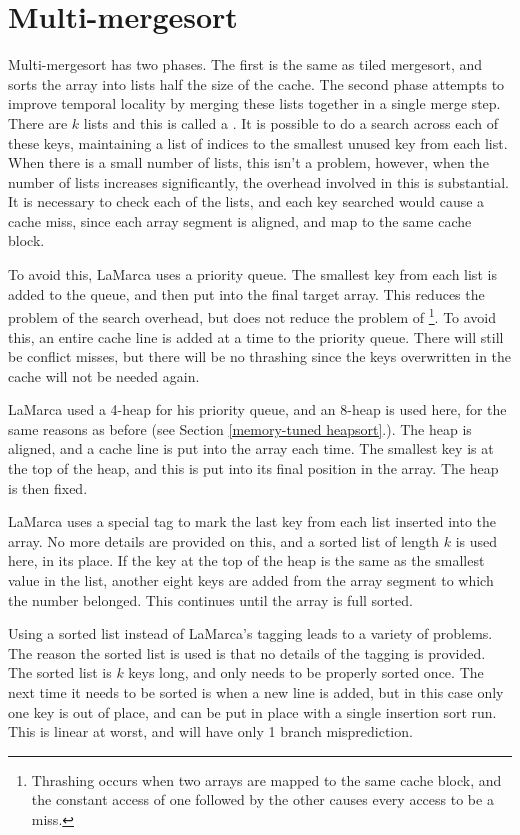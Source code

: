 \section{Multi-mergesort}

Multi-mergesort has two phases. The first is the same as tiled mergesort, and
sorts the array into lists half the size of the cache. The second phase attempts
to improve temporal locality by merging these lists together in a single merge
step. There are $k$ lists and this is called a . It is possible
to do a search across each of these keys, maintaining a list of indices to the
smallest unused key from each list. When there is a small number of lists, this
isn't a problem, however, when the number of lists increases significantly, the
overhead involved in this is substantial. It is necessary to check each of the
lists, and each key searched would cause a cache miss, since each array segment
is aligned, and map to the same cache block.

To avoid this, LaMarca uses a priority queue. The smallest key from each list is
added to the queue, and then put into the final target array. This reduces the
problem of the search overhead, but does not reduce the problem of
\footnote{Thrashing occurs when two arrays are mapped to the same
cache block, and the constant access of one followed by the other causes every
access to be a miss.}.  To avoid this, an entire cache line is added at a time
to the priority queue. There will still be conflict misses, but there will be no
thrashing since the keys overwritten in the cache will not be needed again.

LaMarca used a 4-heap for his priority queue, and an 8-heap is used here, for
the same reasons as before (see Section \ref{memory-tuned heapsort}.). The heap
is aligned, and a cache line is put into the array each time. The smallest key
is at the top of the heap, and this is put into its final position in the array.
The heap is then fixed.

LaMarca uses a special tag to mark the last key from each list inserted into
the array. No more details are provided on this, and a sorted list of length $k$
is used here, in its place.  If the key at the top of the heap is the same as
the smallest value in the list, another eight keys are added from the array
segment to which the number belonged. This continues until the array is full
sorted.

Using a sorted list instead of LaMarca's tagging leads to a variety of problems.
The reason the sorted list is used is that no details of the tagging is
provided. The sorted list is $k$ keys long, and only needs to be properly sorted
once. The next time it needs to be sorted is when a new line is added, but in
this case only one key is out of place, and can be put in place with a single
insertion sort run. This is linear at worst, and will have only 1 branch
misprediction.

